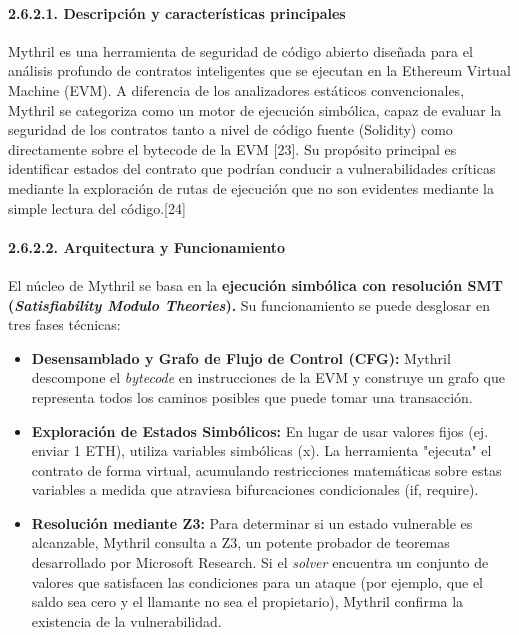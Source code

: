 \paragraph{2.6.2.1. Descripción y características
principales}\label{descripciuxf3n-y-caracteruxedsticas-principales-1}

Mythril es una herramienta de seguridad de código abierto diseñada para
el análisis profundo de contratos inteligentes que se ejecutan en la
Ethereum Virtual Machine (EVM). A diferencia de los analizadores
estáticos convencionales, Mythril se categoriza como un motor de
ejecución simbólica, capaz de evaluar la seguridad de los contratos
tanto a nivel de código fuente (Solidity) como directamente sobre el
bytecode de la EVM {[}23{]}. Su propósito principal es identificar
estados del contrato que podrían conducir a vulnerabilidades críticas
mediante la exploración de rutas de ejecución que no son evidentes
mediante la simple lectura del código.{[}24{]}

\paragraph{2.6.2.2. Arquitectura y
Funcionamiento}\label{arquitectura-y-funcionamiento}

El núcleo de Mythril se basa en la \textbf{ejecución simbólica con
resolución SMT (\emph{Satisfiability Modulo Theories}).} Su
funcionamiento se puede desglosar en tres fases técnicas:

\begin{itemize}
\tightlist
\item
  \textbf{Desensamblado y Grafo de Flujo de Control (CFG):} Mythril
  descompone el \emph{bytecode} en instrucciones de la EVM y construye
  un grafo que representa todos los caminos posibles que puede tomar una
  transacción.
\item
  \textbf{Exploración de Estados Simbólicos:} En lugar de usar valores
  fijos (ej. enviar 1 ETH), utiliza variables simbólicas (x). La
  herramienta "ejecuta" el contrato de forma virtual, acumulando
  restricciones matemáticas sobre estas variables a medida que atraviesa
  bifurcaciones condicionales (if, require).
\item
  \textbf{Resolución mediante Z3:} Para determinar si un estado
  vulnerable es alcanzable, Mythril consulta a Z3, un potente probador
  de teoremas desarrollado por Microsoft Research. Si el \emph{solver}
  encuentra un conjunto de valores que satisfacen las condiciones para
  un ataque (por ejemplo, que el saldo sea cero y el llamante no sea el
  propietario), Mythril confirma la existencia de la vulnerabilidad.
\end{itemize}

